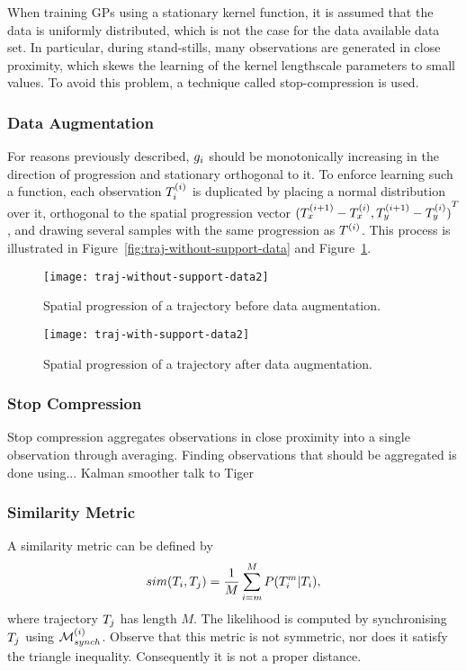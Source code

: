 When training GPs using a stationary kernel function, it is assumed
that the data is uniformly distributed, which is not the case for the
data available data set. In particular, during stand-stills, many
observations are generated in close proximity, which skews the
learning of the kernel lengthscale parameters to small values. To
avoid this problem, a technique called stop-compression is used.

\subsubsection{Data Augmentation}
\label{sec:data-augmentation}
For reasons previously described, $g_{i}$ should be monotonically increasing in
the direction of progression and stationary orthogonal to it. 
To enforce learning such a function, each
observation $T_{i}^{(i)}$ is duplicated by placing a normal distribution
over it, orthogonal to the spatial progression vector ${(T^{(i+1)}_x -
  T^{(i)}_x, T^{(i+1)}_y - T^{(i)}_y)}^T$, and drawing several samples
with the same progression as $T^{(i)}$. This process is illustrated in
Figure~\ref{fig:traj-without-support-data} and
Figure~\ref{fig:traj-with-support-data}. 
\begin{figure}
  \begin{minipage}{.46\textwidth}
    \texttt{[image: traj-without-support-data2]}
    \caption{Spatial progression of a trajectory 
      before data augmentation.}\label{fig:traj-without-support-data}
  \end{minipage}
  \hspace{5pt}
  \begin{minipage}{.46\textwidth}
    \texttt{[image: traj-with-support-data2]}
    \caption{Spatial progression of a trajectory 
      after data augmentation.}\label{fig:traj-with-support-data}
  \end{minipage}
\end{figure}

\subsubsection{Stop Compression}
\label{sec:stop-compression}
Stop compression aggregates observations in close proximity into a
single observation through averaging. Finding observations that should
be aggregated is done using... Kalman smoother talk to Tiger


\subsubsection{Similarity Metric}
A similarity metric can be defined by
\begin{equation}
  sim(T_{i}, T_{j}) = \frac{1}{M}\sum_{i=m}^{M}P(T_{i}^{m} | T_{i}),
\end{equation}
where trajectory $T_{j}$ has length $M$. The likelihood is
computed by synchronising $T_{j}$ using $\mathcal{M}_{synch}^{(i)}$. Observe that this metric is
not symmetric, nor does it satisfy the triangle inequality.
Consequently it is not a proper distance.

